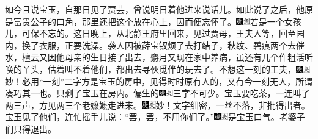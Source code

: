如今且说宝玉，自那日见了贾芸，曾说明日着他进来说话儿。如此说了之后，他原是富贵公子的口角，那里还把这个放在心上，因而便忘怀了。{\includegraphics[width=3mm]{../Images/00004}\includegraphics[width=3mm]{../Images/00011}\footnotesize \kaishu 若是一个女孩儿，可保不忘的。}这日晚上，从北静王府里回来，见过贾母，王夫人等，回至园内，换了衣服，正要洗澡。袭人因被薛宝钗烦了去打结子，秋纹、碧痕两个去催水，檀云又因他母亲的生日接了出去，麝月又现在家中养病，虽还有几个作粗活听唤的丫头，估着叫不着他们，都出去寻伙觅伴的玩去了。不想这一刻的工夫，{\includegraphics[width=3mm]{../Images/00004}\includegraphics[width=3mm]{../Images/00012}\footnotesize \kaishu 妙！必用“一刻”二字方是宝玉的房中，见得时时原有人的，又有今一刻无人，所谓凑巧其一也。}只剩了宝玉在房内。偏生的{\includegraphics[width=3mm]{../Images/00004}\includegraphics[width=3mm]{../Images/00012}\footnotesize \kaishu 三字不可少。}宝玉要吃茶，一连叫了两三声，方见两三个老嬷嬷走进来。{\includegraphics[width=3mm]{../Images/00004}\includegraphics[width=3mm]{../Images/00012}\footnotesize \kaishu 妙！文字细密，一丝不落，非批得出者。}宝玉见了他们，连忙摇手儿说：“罢，罢，不用你们了。”{\includegraphics[width=3mm]{../Images/00004}\includegraphics[width=3mm]{../Images/00012}\footnotesize \kaishu 是宝玉口气。}老婆子们只得退出。

